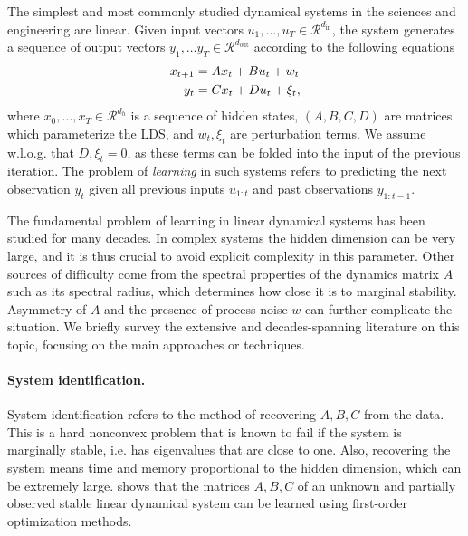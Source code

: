 \documentclass[11pt]{article}
\def\R{{\mathcal R}}
\def\R{\ensuremath{\mathcal R}}
\numberwithin{equation}{section}
\begin{document}
The simplest and most commonly studied dynamical systems in the sciences and engineering are linear. 
Given input vectors $u_1, \dots, u_T \in \R^{d_{\textrm{in}}}$, the system generates a sequence of output vectors $y_1, \dots y_T \in \R^{d_{\textrm{out}}}$ according to the following equations 
\begin{align}
\label{eqn:LDS}
    {x}_{t+1} & = A {x}_t + B u_t + w_t \\
    y_t & = C {x}_t + {D} u_t + \xi_t, \notag
\end{align}
where ${x}_0, \dots, {x}_T \in \R^{d_h}$ is a sequence of hidden states, $(A, B, C, {D})$ are matrices which parameterize the LDS, and $w_t, \xi_t$ are perturbation terms. We assume w.l.o.g. that ${D},\xi_t = 0$, as these terms can be folded into the input of the previous iteration. The problem of {\it learning} in such systems refers to predicting the next observation $y_t$ given all previous inputs $u_{1:t}$ and past observations $y_{1:t-1}$. 


The fundamental problem of learning in linear dynamical systems has been studied for many decades. In complex systems the hidden dimension can be very large, and it is thus crucial to avoid explicit complexity in this parameter. Other sources of difficulty come from the spectral properties of the dynamics matrix $A$ such as its spectral radius, which determines how close it is to marginal stability. Asymmetry of $A$ and the presence of process noise $w$ can further complicate the situation. 
We briefly survey the extensive and decades-spanning literature on this topic, focusing on the main approaches or techniques. 

\paragraph{System identification.}
System identification refers to the method of recovering $A,B,C$ from the data. This is a hard nonconvex problem that is known to fail if the system is marginally stable, i.e. has eigenvalues that are close to one. Also, recovering the system means time and memory proportional to the hidden dimension, which can be extremely large. \cite{hardt2018gradient} shows that the matrices $A,B,C$ of an unknown and partially observed stable linear dynamical system can be learned using first-order optimization methods. 
\end{document}
